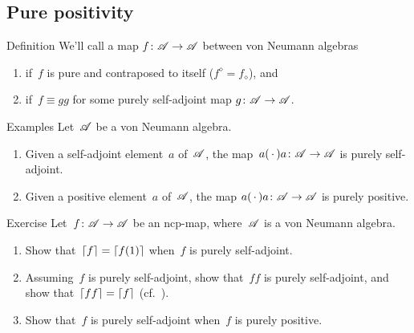 \documentclass[a]{subfiles}
\begin{document}
\subsection{Pure positivity}
\begin{parsec}%
\begin{point}{Definition}%
We'll call a map $f\colon \mathscr{A}\to\mathscr{A}$
between von Neumann algebras
\begin{enumerate}
\item
{}
if~$f$ is pure and contraposed to itself
($f^\diamond = f_\diamond$), and
\item
{}
if~$f\equiv gg$
for some purely self-adjoint map
$g\colon \mathscr{A}\to\mathscr{A}$.
\end{enumerate}
\end{point}
\begin{point}{Examples}%
Let~$\mathscr{A}$ be a von Neumann algebra.
\begin{enumerate}
\item
Given a self-adjoint element~$a$ of~$\mathscr{A}$,
the map~$a(\,\cdot\,)a\colon \mathscr{A}\to\mathscr{A}$ is 
purely self-adjoint.
\item
Given a positive element~$a$ of~$\mathscr{A}$,
the map $a(\,\cdot\,)a\colon \mathscr{A}\to\mathscr{A}$
is purely positive.
\end{enumerate}
\end{point}
\begin{point}{Exercise}%
Let~$f\colon \mathscr{A}\to\mathscr{A}$
be an ncp-map,
where~$\mathscr{A}$ is a von Neumann algebra.
\begin{enumerate}
\item
Show that~$\left\lceil f\right\rceil=\left\lceil f(1)\right\rceil$ when~$f$
is purely self-adjoint.
\item
Assuming~$f$ is purely self-adjoint,
show that~$ff$ is purely self-adjoint,
and show that~$\left\lceil ff\right\rceil=\left\lceil f\right\rceil$ (cf.~).
\item
Show that~$f$ is purely self-adjoint
when~$f$ is purely positive.
\end{enumerate}
\end{point}
\end{parsec}
\end{document}

